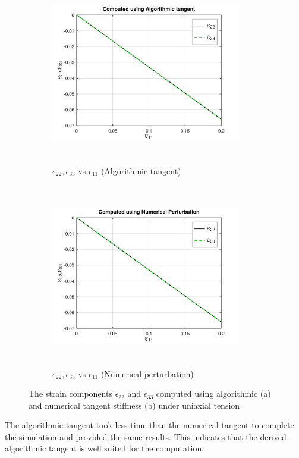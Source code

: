 \documentclass[12pt,a4paper,twoside,openright]{report}
\begin{document}
\begin{figure}[htbp!]
     \begin{subfigure}{0.4\textwidth}
         \includegraphics[width=8.3cm,height=8cm,keepaspectratio]{22.e11vse22e33_ATS.png}
         \caption{$\epsilon_{22}, \epsilon_{33}$ vs $\epsilon_{11}$ (Algorithmic tangent)}
         \label{fig:Algorithmic tangent}
     \end{subfigure}  
     \hspace{1.8cm}
     \begin{subfigure}{0.4\textwidth}
         \includegraphics[width=8.3cm,height=8cm,keepaspectratio]{22.e11vse22e33_NT.png}
         \caption{$\epsilon_{22}, \epsilon_{33}$ vs $\epsilon_{11}$ (Numerical perturbation)}
         \label{fig:Numerical perturbation}
     \end{subfigure}
        \caption{The strain components $\epsilon_{22}$ and $\epsilon_{33}$ computed using algorithmic (a) and numerical tangent stiffness (b) under uniaxial tension}
        \label{fig: Algorithmic and numerical tangent stiffness under uniaxial tension}     
\end{figure}
\FloatBarrier
The algorithmic tangent took less time than the numerical tangent to complete the simulation and provided the same results. This indicates that the derived algorithmic tangent is well suited for the computation.  
\end{document}
